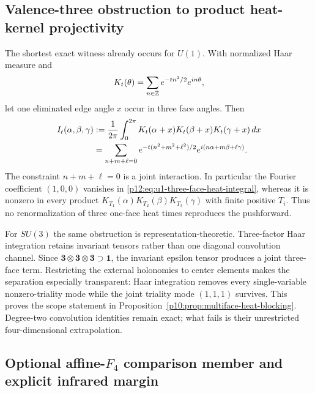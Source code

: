 \documentclass[12pt,a4paper]{article}
\begin{document}
\subsection{Valence-three obstruction to product heat-kernel projectivity}
\label{p12:app:valence-three-heat-projectivity-obstruction}

The shortest exact witness already occurs for $U(1)$.  With normalized Haar
measure and
\[
 K_t(\theta)=\sum_{n\in\mathbb{Z}}e^{-tn^2/2}e^{in\theta},
\]
let one eliminated edge angle $x$ occur in three face angles.  Then
\begin{equation}
\label{p12:eq:u1-three-face-heat-integral}
\begin{aligned}
 I_t(\alpha,\beta,\gamma)
 &:={1\over2\pi}\int_0^{2\pi}
 K_t(\alpha+x)K_t(\beta+x)K_t(\gamma+x)\,dx\\
 &=\sum_{n+m+\ell=0}
 e^{-t(n^2+m^2+\ell^2)/2}
 e^{i(n\alpha+m\beta+\ell\gamma)}.
\end{aligned}
\end{equation}
The constraint $n+m+\ell=0$ is a joint interaction.  In particular the
Fourier coefficient $(1,0,0)$ vanishes in
\eqref{p12:eq:u1-three-face-heat-integral}, whereas it is nonzero in every
product $K_{T_1}(\alpha)K_{T_2}(\beta)K_{T_3}(\gamma)$ with finite positive
$T_i$.  Thus no renormalization of three one-face heat times reproduces the
pushforward.

For $SU(3)$ the same obstruction is representation-theoretic.  Three-factor
Haar integration retains invariant tensors rather than one diagonal
convolution channel.  Since
$\mathbf3\otimes\mathbf3\otimes\mathbf3\supset\mathbf1$, the invariant
epsilon tensor produces a joint three-face term.  Restricting the external
holonomies to center elements makes the separation especially transparent:
Haar integration removes every single-variable nonzero-triality mode while
the joint triality mode $(1,1,1)$ survives.  This proves the scope statement
in Proposition~\ref{p10:prop:multiface-heat-blocking}.  Degree-two
convolution identities remain exact; what fails is their unrestricted
four-dimensional extrapolation.


\subsection{Optional affine-\texorpdfstring{$F_4$}{F4} comparison member and explicit infrared margin}
\label{p12:app:optional-affine-f4-heat-certificate}
\end{document}
